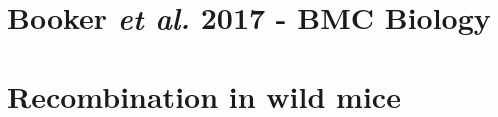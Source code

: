 \documentclass[openright,oneside,a4paper,english,11pt]{book}
\newcommand{\dir}{/Users/s0784966/Dropbox/Thesis}
\begin{document}
\frontmatter




	\singlespacing
	 
	
	

	\tableofcontents

	\listoffigures

	\listoftables

	\renewcommand{\contentsname}{Table of Contents}

	\doublespacing
	
\mainmatter
	
	

	
	
	
	
	
	
	\singlespacing

	 

	\doublespacing



	\begin{appendices}

		\chapter{Booker \emph{et al.} 2017 - BMC Biology}

		  

		\chapter{Recombination in wild mice}

		

	\end{appendices}
\end{document}
